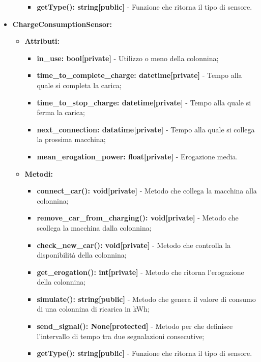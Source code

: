 \documentclass[8pt]{article}
\begin{document}
\begin{itemize}
\begin{itemize}
\begin{itemize}
            \item \textbf{getType(): string[public]} - Funzione che ritorna il tipo di sensore.
        \end{itemize}
    \end{itemize}
    \item \textbf{ChargeConsumptionSensor:}
    \begin{itemize}
	\setlength\itemsep{0em}
        \item \textbf{Attributi:}
        \begin{itemize}
	\setlength\itemsep{0em}
            \item \textbf{in\_use: bool[private]} - Utilizzo o meno della colonnina;
            \item \textbf{time\_to\_complete\_charge: datetime[private]} - Tempo alla quale si completa la carica;
            \item \textbf{time\_to\_stop\_charge: datetime[private]} - Tempo alla quale si ferma la carica;
            \item \textbf{next\_connection: datatime[private]} - Tempo alla quale si collega la prossima macchina;
            \item \textbf{mean\_erogation\_power: float[private]} - Erogazione media.
        \end{itemize}
        \item \textbf{Metodi:}
        \begin{itemize}
	\setlength\itemsep{0em}
            \item \textbf{connect\_car(): void[private]} - Metodo che collega la macchina alla colonnina;
            \item \textbf{remove\_car\_from\_charging(): void[private]} - Metodo che scollega la macchina dalla colonnina;
            \item \textbf{check\_new\_car(): void[private]} - Metodo che controlla la disponibilità della colonnina;
            \item \textbf{get\_erogation(): int[private]} - Metodo che ritorna l'erogazione della colonnina;
            \item \textbf{simulate(): string[public]} - Metodo che genera il valore di consumo di una colonnina di ricarica in kWh;
            \item \textbf{send\_signal(): None[protected]} - Metodo per che definisce l'intervallo di tempo tra due segnalazioni consecutive;
            \item \textbf{getType(): string[public]} - Funzione che ritorna il tipo di sensore.
        \end{itemize}
    \end{itemize}
\end{itemize}
\end{document}
